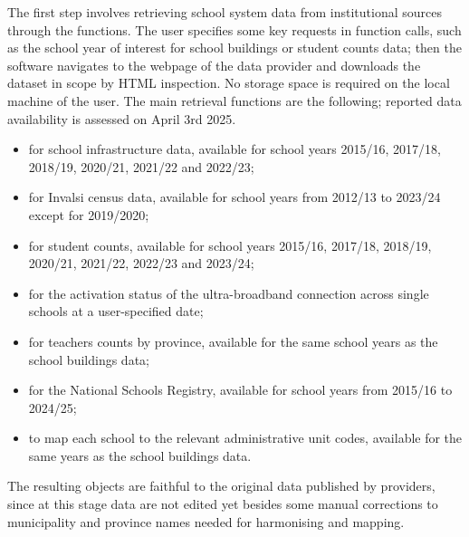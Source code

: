 \documentclass{article}%
\begin{document}
The first step involves retrieving school system data from institutional sources through the \texttt{} functions. The user specifies some key requests in function calls, such as the school year of interest for school buildings or student counts data; then the software navigates to the webpage of the data provider and downloads the dataset in scope by HTML inspection. No storage space is required on the local machine of the user. The main retrieval functions are the following; reported data availability is assessed on April 3rd 2025.
\begin{itemize}
    \item \texttt{} for school infrastructure data, available for school years 2015/16, 2017/18, 2018/19, 2020/21, 2021/22 and 2022/23;
    \item \texttt{} for Invalsi census data, available for school years from 2012/13 to 2023/24 except for 2019/2020; 
    \item \texttt{} for student counts, available for school years 2015/16, 2017/18, 2018/19, 2020/21, 2021/22, 2022/23 and 2023/24;
    \item \texttt{} for the activation status of the ultra-broadband connection across single schools at a user-specified date;
    \item \texttt{} for teachers counts by province, available for the same school years as the school buildings data;
    \item \texttt{} for the National Schools Registry, available for school years from 2015/16 to 2024/25;
    \item \texttt{} to map each school to the relevant administrative unit codes, available for the same years as the school buildings data.
\end{itemize}
The resulting objects are faithful to the original data published by providers, since at this stage data are not edited yet besides some manual corrections to municipality and province names needed for harmonising and mapping. 
\end{document}
